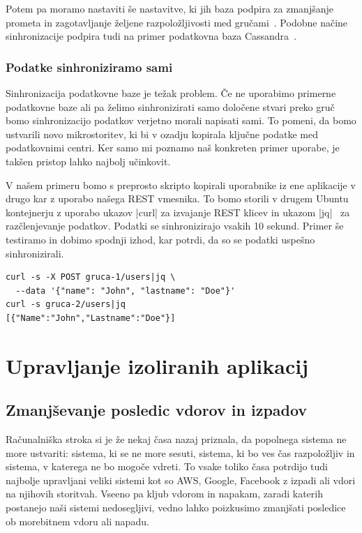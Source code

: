 \documentclass[a4paper, 12pt]{book}
\begin{document}
Potem pa moramo nastaviti še nastavitve, ki jih baza podpira za zmanj\-šan\-je prometa in zagotavljanje željene razpoložljivosti med gručami~\cite{cratedb-zone}.
Podobne načine sinhronizacije podpira tudi na primer podatkovna baza Cassandra~\cite{cassandra-zone}.
\subsection{Podatke sinhroniziramo sami}
Sinhronizacija podatkovne baze je težak problem.
Če ne uporabimo primerne podatkovne baze ali pa želimo sinhronizirati samo določene stvari preko gruč bomo sinhronizacijo podatkov verjetno morali napisati sami.
To pomeni, da bomo ustvarili novo mikrostoritev, ki bi v ozadju kopirala ključne podatke med podatkovnimi centri.
Ker samo mi poznamo naš konkreten primer uporabe, je takšen pristop lahko najbolj učinkovit.

V našem primeru bomo s preprosto skripto kopirali uporabnike iz ene aplikacije v drugo kar z uporabo našega REST vmesnika.
To bomo storili v drugem Ubuntu kontejnerju z uporabo ukazov \spverb|curl| za izvajanje REST klicev in ukazom \spverb|jq|~\cite{jq} za razčlenjevanje podatkov.
Podatki se sinhronizirajo vsakih 10 sekund.
Primer še testiramo in dobimo spodnji izhod, kar potrdi, da so se podatki uspešno sinhronizirali.
\begin{verbatim}
curl -s -X POST gruca-1/users|jq \
  --data '{"name": "John", "lastname": "Doe"}'
curl -s gruca-2/users|jq
[{"Name":"John","Lastname":"Doe"}]
\end{verbatim}
\chapter{Upravljanje izoliranih aplikacij}
\section{Zmanjševanje posledic vdorov in izpadov}
  Računalniška stroka si je že nekaj časa nazaj priznala, da popolnega sistema ne more ustvariti: sistema, ki se ne more sesuti, sistema, ki bo ves čas razpoložljiv in sistema, v katerega ne bo mogoče vdreti.
To vsake toliko časa potrdijo tudi najbolje upravljani veliki sistemi kot so AWS, Google, Facebook z izpadi ali vdori na njihovih storitvah. 
Vseeno pa kljub vdorom in napakam, zaradi katerih postanejo naši sistemi nedosegljivi, vedno lahko poizkusimo zmanjšati posledice ob morebitnem vdoru ali napadu. 
\end{document}

